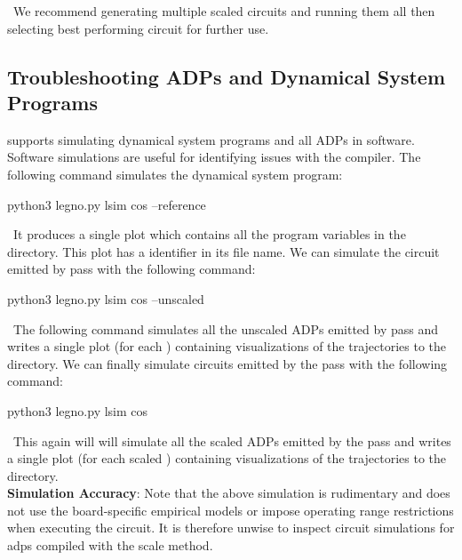 \noindent~We recommend generating multiple scaled circuits and running them all then
selecting best performing circuit for further use. 

\subsection{Troubleshooting ADPs and Dynamical System Programs}

 supports simulating dynamical system programs and all ADPs in
software. Software simulations are useful for identifying issues with the
compiler. The following command simulates the  dynamical system program:

\begin{snippet}
python3 legno.py lsim cos --reference
\end{snippet}

\noindent~It produces a single plot which contains all the program variables in the
 directory. This plot has a  identifier in its file name.
We can simulate the circuit emitted by  pass with the following command:

\begin{snippet}
python3 legno.py lsim cos --unscaled
\end{snippet}

\noindent~The following command simulates all the unscaled  ADPs emitted by
 pass and
writes a single plot (for each ) containing visualizations of the trajectories to the  directory. We
can finally simulate circuits emitted by the  pass with the following command:

\begin{snippet}
python3 legno.py lsim cos
\end{snippet}

\noindent~This again will will simulate all the scaled  ADPs emitted by the
 pass and writes a single plot (for each scaled ) containing
visualizations of the trajectories to the  directory.\\


\noindent\textbf{Simulation Accuracy}: Note that the above simulation is rudimentary and does not use the board-specific
empirical models or impose operating range restrictions when executing the
circuit. It is therefore unwise to inspect circuit simulations for adps compiled
with the  scale method. 
